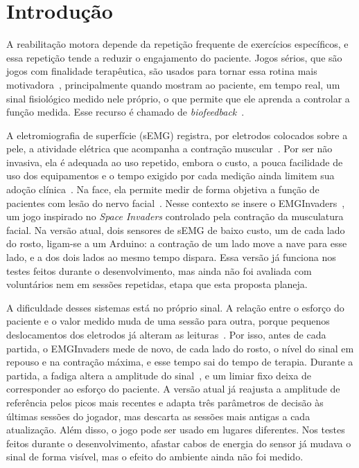 \documentclass[runningheads]{llncs}
\begin{document}
\section{Introdução}\label{sec:introducao}

A reabilitação motora depende da repetição frequente de exercícios específicos, e essa repetição tende a reduzir o engajamento do paciente. Jogos sérios, que são jogos com finalidade terapêutica, são usados para tornar essa rotina mais motivadora~\citep{lohse2013video}, principalmente quando mostram ao paciente, em tempo real, um sinal fisiológico medido nele próprio, o que permite que ele aprenda a controlar a função medida. Esse recurso é chamado de \textit{biofeedback}~\citep{giggins2013biofeedback}.

A eletromiografia de superfície (sEMG) registra, por eletrodos colocados sobre a pele, a atividade elétrica que acompanha a contração muscular~\citep{hermens2000seniam}. Por ser não invasiva, ela é adequada ao uso repetido, embora o custo, a pouca facilidade de uso dos equipamentos e o tempo exigido por cada medição ainda limitem sua adoção clínica~\citep{campanini2020barriers}. Na face, ela permite medir de forma objetiva a função de pacientes com lesão do nervo facial~\citep{franz2024facial}. Nesse contexto se insere o EMGInvaders~\citep{sousa2026emginvaders}, um jogo inspirado no \textit{Space Invaders} controlado pela contração da musculatura facial. Na versão atual, dois sensores de sEMG de baixo custo, um de cada lado do rosto, ligam-se a um Arduino: a contração de um lado move a nave para esse lado, e a dos dois lados ao mesmo tempo dispara. Essa versão já funciona nos testes feitos durante o desenvolvimento, mas ainda não foi avaliada com voluntários nem em sessões repetidas, etapa que esta proposta planeja.

A dificuldade desses sistemas está no próprio sinal. A relação entre o esforço do paciente e o valor medido muda de uma sessão para outra, porque pequenos deslocamentos dos eletrodos já alteram as leituras~\citep{young2011electrode}. Por isso, antes de cada partida, o EMGInvaders mede de novo, de cada lado do rosto, o nível do sinal em repouso e na contração máxima, e esse tempo sai do tempo de terapia. Durante a partida, a fadiga altera a amplitude do sinal~\citep{cifrek2009fatigue}, e um limiar fixo deixa de corresponder ao esforço do paciente. A versão atual já reajusta a amplitude de referência pelos picos mais recentes e adapta três parâmetros de decisão às últimas sessões do jogador, mas descarta as sessões mais antigas a cada atualização. Além disso, o jogo pode ser usado em lugares diferentes. Nos testes feitos durante o desenvolvimento, afastar cabos de energia do sensor já mudava o sinal de forma visível, mas o efeito do ambiente ainda não foi medido.
\end{document}
